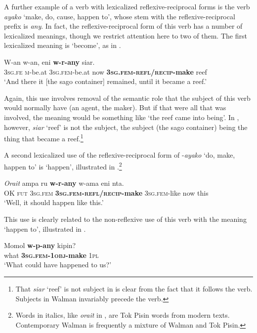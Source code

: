 \documentclass[output=paper]{langscibook}
\begin{document}
  A further example of a verb with lexicalized reflexive-reciprocal forms is the verb \emph{ayako} ‘make, do, cause, happen to’, whose stem with the reflexive-reciprocal prefix is \emph{any}. In fact, the reflexive-reciprocal form of this verb has a number of lexicalized meanings, though we restrict attention here to two of them. The first lexicalized meaning is ‘become’, as in .

\ea%
    \label{ex:Brown:39}
    \gll  W-an  w-an,  eni  \textbf{w-r-any}  siar.\\
 \textsc{3sg.fe}%
\textsc{m}{}-be.at  \textsc{3sg.fem}{}-be.at  now  \textbf{\textsc{3sg.fem}}\textbf{{}-}\textbf{\textsc{refl/recip}}\textbf{{}-make}  reef\\
    \glt ‘And there it [the sago container] remained, until it became a reef.’ 
    \z


Again, this use involves removal of the semantic role that the subject of this verb would normally have (an agent, the maker). But if that were all that was involved, the meaning would be something like ‘the reef came into being’. In , however, \emph{siar} ‘reef’ is not the subject, the subject (the sago container) being the thing that became a reef.\footnote{ That \emph{siar} ‘reef’ is not subject in  is clear from the fact that it follows the verb. Subjects in Walman invariably precede the verb.}



  A second lexicalized use of the reflexive-reciprocal form of -\emph{ayako} ‘do, make, happen to’ is ‘happen’, illustrated in .\footnote{ Words in italics, like \emph{orait} in , are Tok Pisin words from modern texts. Contemporary Walman is frequently a mixture of Walman and Tok Pisin.}


\ea%
    \label{ex:Brown:40}
    \gll \textit{Orait}  ampa  ru  \textbf{w-r-any}   w-ama eni  nta.\\
 OK  \textsc{fut}  \textsc{3sg.fem}  \textbf{\textsc{3sg.fem}}\textbf{{}-}\textbf{\textsc{refl/recip}}\textbf{{}-make}  \textsc{3sg.fem}{}-like now  this\\
    \glt ‘Well, it should happen like this.’
    \z


This use is clearly related to the non-reflexive use of this verb with the meaning ‘happen to’, illustrated in .


\ea%
    \label{ex:Brown:41}
    \gll  Momol  \textbf{w-p-any}  kipin?\\
 what  \textbf{\textsc{3sg.fem}}\textbf{{}-}\textbf{\textsc{1obj}}\textbf{{}-make}  \textsc{1pl}\\
    \glt ‘What could have happened to us?’
    \z
\end{document}
